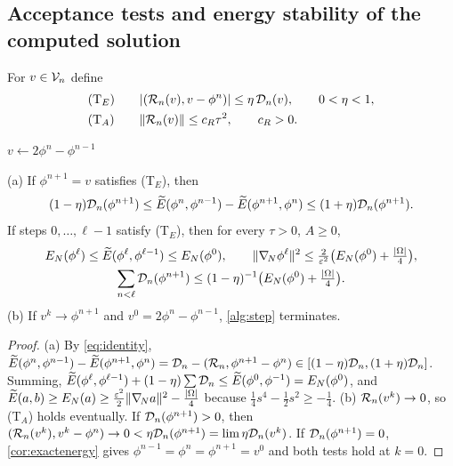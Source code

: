 \subsection{Acceptance tests and energy stability of the computed solution}
For $v\in\mathcal{V}_n$ define
\begin{align}
&\text{(T$_E$)}\qquad|(\mathcal{R}_n(v),v-\phi^n)|\le\eta\,\mathcal{D}_n(v),\qquad 0<\eta<1,\label{eq:TE}\\
&\text{(T$_A$)}\qquad\lVert \mathcal{R}_n(v)\rVert\le c_R\tau^2,\qquad c_R>0 .\label{eq:TA}
\end{align}
\begin{algorithm}[t]
\caption{One time step with inexact solve}\label{alg:step}
$v\gets2\phi^n-\phi^{n-1}$\;
\end{algorithm}

\begin{theorem}\label{thm:energysafe}
{\rm(a)} If $\phi^{n+1}=v$ satisfies (T$_E$), then
\begin{equation}\label{eq:energysafe}
(1-\eta)\mathcal{D}_n(\phi^{n+1})\le\widetilde{E}(\phi^n,\phi^{n-1})-\widetilde{E}(\phi^{n+1},\phi^n)\le(1+\eta)\mathcal{D}_n(\phi^{n+1}).
\end{equation}
If steps $0,\dots,\ell-1$ satisfy (T$_E$), then for every $\tau>0$, $A\ge0$,
\begin{gather*}
E_N(\phi^\ell)\le\widetilde{E}(\phi^\ell,\phi^{\ell-1})\le E_N(\phi^0),\qquad \lVert \nabla_{\!N}\phi^\ell\rVert^2\le\tfrac2{\varepsilon^2}\big(E_N(\phi^0)+\tfrac{|\Omega|}4\big),\\
\sum_{n<\ell}\mathcal{D}_n(\phi^{n+1})\le(1-\eta)^{-1}\big(E_N(\phi^0)+\tfrac{|\Omega|}4\big).
\end{gather*}
{\rm(b)} If $v^k\to\phi^{n+1}$ and $v^0=2\phi^n-\phi^{n-1}$, \cref{alg:step} terminates.
\end{theorem}

\begin{proof}
(a) By \eqref{eq:identity}, $\widetilde{E}(\phi^n,\phi^{n-1})-\widetilde{E}(\phi^{n+1},\phi^n)=\mathcal{D}_n-(\mathcal{R}_n,\phi^{n+1}-\phi^n)\in[(1-\eta)\mathcal{D}_n,(1+\eta)\mathcal{D}_n]$. Summing, $\widetilde{E}(\phi^\ell,\phi^{\ell-1})+(1-\eta)\sum\mathcal{D}_n\le\widetilde{E}(\phi^0,\phi^{-1})=E_N(\phi^0)$, and $\widetilde{E}(a,b)\ge E_N(a)\ge\frac{\varepsilon^2}2\lVert \nabla_{\!N} a\rVert^2-\frac{|\Omega|}4$ because $\frac14s^4-\frac12s^2\ge-\frac14$.
(b) $\mathcal{R}_n(v^k)\to0$, so (T$_A$) holds eventually. If $\mathcal{D}_n(\phi^{n+1})>0$, then $(\mathcal{R}_n(v^k),v^k-\phi^n)\to0<\eta\mathcal{D}_n(\phi^{n+1})=\lim\eta\mathcal{D}_n(v^k)$. If $\mathcal{D}_n(\phi^{n+1})=0$, \cref{cor:exactenergy} gives $\phi^{n-1}=\phi^n=\phi^{n+1}=v^0$ and both tests hold at $k=0$.
\end{proof}

